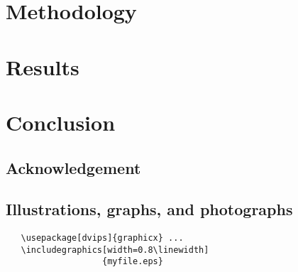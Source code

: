 \documentclass[final]{cvpr}
\begin{document}
\section{Methodology}

\section{Results}

\section{Conclusion}

\subsection{Acknowledgement}


\subsection{Illustrations, graphs, and photographs}
{\small\begin{verbatim}
   \usepackage[dvips]{graphicx} ...
   \includegraphics[width=0.8\linewidth]
                   {myfile.eps}
\end{verbatim}
}

{\small


}
\end{document}
